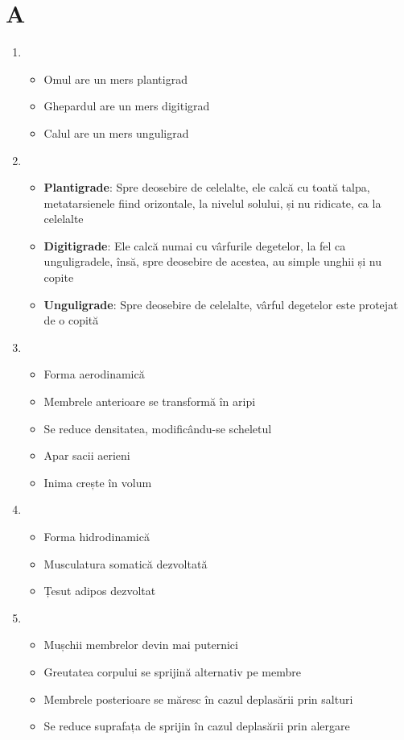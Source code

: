 \documentclass{article}
\begin{document}
\section*{A}
\begin{enumerate}[label=\alph*.]
	\item \begin{itemize}
		\item Omul are un mers plantigrad
		\item Ghepardul are un mers digitigrad
		\item Calul are un mers unguligrad
	\end{itemize}
	\item \begin{itemize}
		\item \textbf{Plantigrade}: Spre deosebire de celelalte, ele calcă cu toată talpa, metatarsienele fiind orizontale, la nivelul solului, și nu ridicate, ca la celelalte
		\item \textbf{Digitigrade}: Ele calcă numai cu vârfurile degetelor, la fel ca unguligradele, însă, spre deosebire de acestea, au simple unghii și nu copite
		\item \textbf{Unguligrade}: Spre deosebire de celelalte, vârful degetelor este protejat de o copită
	\end{itemize}
	\item \begin{itemize}
		\item Forma aerodinamică
		\item Membrele anterioare se transformă în aripi
		\item Se reduce densitatea, modificându-se scheletul
		\item Apar sacii aerieni
		\item Inima crește în volum
	\end{itemize}
	\item \begin{itemize}
		\item Forma hidrodinamică
		\item Musculatura somatică dezvoltată
		\item Țesut adipos dezvoltat
	\end{itemize}
	\item \begin{itemize}
		\item Mușchii membrelor devin mai puternici
		\item Greutatea corpului se sprijină alternativ pe membre
		\item Membrele posterioare se măresc în cazul deplasării prin salturi
		\item Se reduce suprafața de sprijin în cazul deplasării prin alergare
	\end{itemize}
\end{enumerate}
\end{document}

